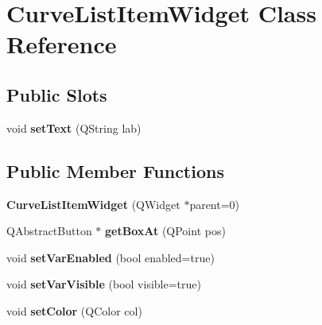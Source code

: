 \hypertarget{class_curve_list_item_widget}{
\section{\-Curve\-List\-Item\-Widget \-Class \-Reference}
\label{class_curve_list_item_widget}
}
\subsection*{\-Public \-Slots}
\begin{DoxyCompactItemize}
\item 
\hypertarget{class_curve_list_item_widget_a375244a179db79724c4c4d5af97cfa4c}{
void {\bfseries set\-Text} (\-Q\-String lab)}
\label{class_curve_list_item_widget_a375244a179db79724c4c4d5af97cfa4c}

\end{DoxyCompactItemize}
\subsection*{\-Public \-Member \-Functions}
\begin{DoxyCompactItemize}
\item 
\hypertarget{class_curve_list_item_widget_a7a61d4fa809f299e009012016569ea3d}{
{\bfseries \-Curve\-List\-Item\-Widget} (\-Q\-Widget $\ast$parent=0)}
\label{class_curve_list_item_widget_a7a61d4fa809f299e009012016569ea3d}

\item 
\hypertarget{class_curve_list_item_widget_a81744b9824ea118d515335f08933d4e8}{
\-Q\-Abstract\-Button $\ast$ {\bfseries get\-Box\-At} (\-Q\-Point pos)}
\label{class_curve_list_item_widget_a81744b9824ea118d515335f08933d4e8}

\item 
\hypertarget{class_curve_list_item_widget_ae9f442e364bb7a238ff9efeb807939de}{
void {\bfseries set\-Var\-Enabled} (bool enabled=true)}
\label{class_curve_list_item_widget_ae9f442e364bb7a238ff9efeb807939de}

\item 
\hypertarget{class_curve_list_item_widget_a1aa0ee1052ba591a0d932e523d95d259}{
void {\bfseries set\-Var\-Visible} (bool visible=true)}
\label{class_curve_list_item_widget_a1aa0ee1052ba591a0d932e523d95d259}

\item 
\hypertarget{class_curve_list_item_widget_aaf1453c6e59186e1fb9fdf8d3d598e4e}{
void {\bfseries set\-Color} (\-Q\-Color col)}
\label{class_curve_list_item_widget_aaf1453c6e59186e1fb9fdf8d3d598e4e}

\end{DoxyCompactItemize}
